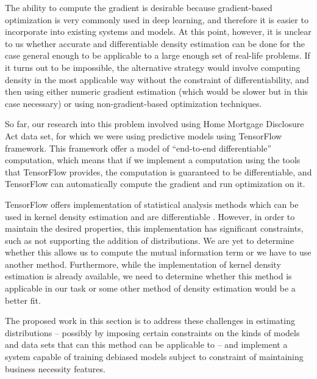 The ability to compute the gradient is desirable because gradient-based
optimization is very commonly used in deep learning\cite{Goodfellow-et-al-2016},
and therefore it is easier to incorporate into existing systems and models. At
this point, however, it is unclear to us whether accurate and differentiable
density estimation can be done for the case general enough to be applicable to a
large enough set of real-life problems. If it turns out to be impossible, the
alternative strategy would involve computing density in the most applicable way
without the constraint of differentiability, and then using either numeric
gradient estimation (which would be slower but in this case necessary) or using
non-gradient-based optimization techniques.

So far, our research into this problem involved using Home Mortgage Disclosure
Act data set\cite{https://www.ffiec.gov/hmda/hmdaflat.htm}, for which we were
using predictive models using TensorFlow framework. This framework offer a model
of ``end-to-end differentiable'' computation, which means that if we implement a
computation using the tools that TensorFlow provides, the computation is
guaranteed to be differentiable, and TensorFlow can automatically compute the
gradient and run optimization on it.

TensorFlow offers implementation of statistical analysis methods
which can be used in kernel density estimation and are differentiable
\cite{171110604}. However, in order to maintain the desired properties, this
implementation has significant constraints, such as not supporting the addition
of distributions. We are yet to determine whether this allows us to compute the
mutual information term or we have to use another method. Furthermore, while the
implementation of kernel density estimation is already available, we need to
determine whether this method is applicable in our task or some other method of
density estimation would be a better fit.

The proposed work in this section is to address these challenges in estimating
distributions -- possibly by imposing certain constraints on the kinds of models
and data sets that can this method can be applicable to -- and implement a
system capable of training debiased models subject to constraint of maintaining
business necessity features.

